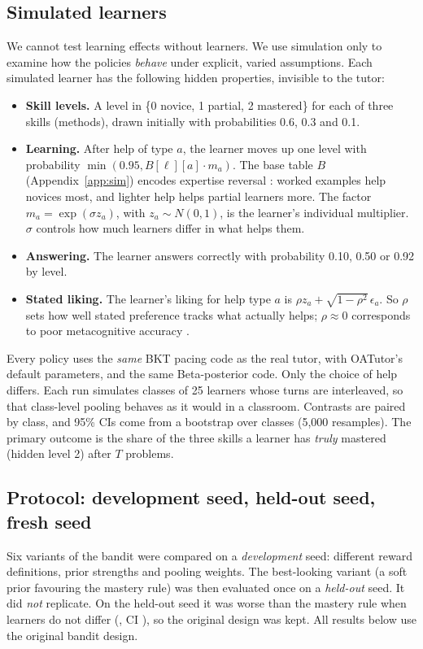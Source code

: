 \documentclass[11pt,a4paper]{article}
\begin{document}
\subsection{Simulated learners}
We cannot test learning effects without learners. We use simulation only to examine how the
policies \emph{behave} under explicit, varied assumptions. Each simulated learner has the
following hidden properties, invisible to the tutor:
\begin{itemize}
  \item \textbf{Skill levels.} A level in \{0 novice, 1 partial, 2 mastered\} for each of
        three skills (methods), drawn initially with probabilities 0.6, 0.3 and 0.1.
  \item \textbf{Learning.} After help of type $a$, the learner moves up one level with
        probability $\min(0.95, B[\ell][a]\cdot m_a)$. The base table $B$
        (Appendix~\ref{app:sim}) encodes expertise reversal \citep{kalyuga2003expertise}:
        worked examples help novices most, and lighter help helps partial learners more.
        The factor $m_a = \exp(\sigma z_a)$, with $z_a \sim N(0,1)$, is the learner's
        individual multiplier. $\sigma$ controls how much learners differ in what helps
        them.
  \item \textbf{Answering.} The learner answers correctly with probability 0.10, 0.50 or
        0.92 by level.
  \item \textbf{Stated liking.} The learner's liking for help type $a$ is
        $\rho z_a + \sqrt{1-\rho^2}\,\epsilon_a$. So $\rho$ sets how well stated preference
        tracks what actually helps; $\rho \approx 0$ corresponds to poor metacognitive
        accuracy \citep{mihalca2017accuracy}.
\end{itemize}
Every policy uses the \emph{same} BKT pacing code as the real tutor, with OATutor's default
parameters, and the same Beta-posterior code. Only the choice of help differs. Each run
simulates classes of 25 learners whose turns are interleaved, so that class-level pooling
behaves as it would in a classroom. Contrasts are paired by class, and 95\% CIs come from a
bootstrap over classes (5,000 resamples). The primary outcome is the share of the three skills a learner has
\emph{truly} mastered (hidden level 2) after $T$ problems.

\subsection{Protocol: development seed, held-out seed, fresh seed}
Six variants of the bandit were compared on a \emph{development} seed: different reward
definitions, prior strengths and pooling weights. The best-looking variant (a soft prior
favouring the mastery rule) was then evaluated once on a \emph{held-out} seed. It did
\emph{not} replicate. On the held-out seed it was worse than the mastery rule when learners
do not differ (\numDTwoHeldoutDiff{}, CI \numDTwoHeldoutCI{}), so the original design was
kept. All results below use the original bandit design.
\end{document}
